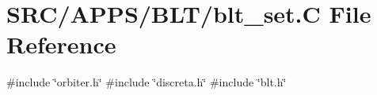 \hypertarget{blt__set_8_c}{}\section{S\+R\+C/\+A\+P\+P\+S/\+B\+L\+T/blt\+\_\+set.C File Reference}
\label{blt__set_8_c}
{\ttfamily \#include \char`\"{}orbiter.\+h\char`\"{}}\newline
{\ttfamily \#include \char`\"{}discreta.\+h\char`\"{}}\newline
{\ttfamily \#include \char`\"{}blt.\+h\char`\"{}}\newline
